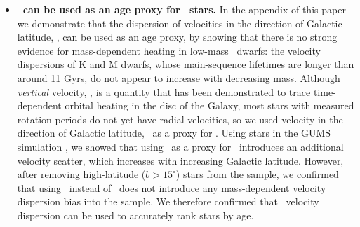 \begin{itemize}
\item{{\bf \sigmavb\ can be used as an age proxy for \kepler\ stars.} In the
    appendix of this paper we demonstrate that the dispersion of velocities in
        the direction of Galactic latitude, \vb, can be used as an age proxy,
        by showing that there is no strong evidence for mass-dependent heating
        in low-mass \kepler\ dwarfs: the velocity dispersions of K and M
        dwarfs, whose main-sequence lifetimes are longer than around 11 Gyrs,
        do not appear to increase with decreasing mass.
Although {\it vertical} velocity, \vz, is a quantity that has been
demonstrated to trace time-dependent orbital heating in the disc of the
Galaxy, most stars with measured rotation periods do not yet have radial
velocities, so we used velocity in the direction of Galactic latitude, \vb\,
as a proxy for \vz.
        Using stars in the GUMS simulation \citep{robin2012}, we showed that
        using \vb\ as a proxy for \vz\ introduces an additional
        velocity scatter, which increases with increasing Galactic
        latitude.
However, after removing high-latitude ($b>15^\circ$) stars from the sample, we
confirmed that using \vb\ instead of \vz\ does not introduce any
mass-dependent velocity dispersion bias into the sample.
We therefore confirmed that \vb\ velocity dispersion can be used to accurately
rank stars by age.}

\end{itemize}
